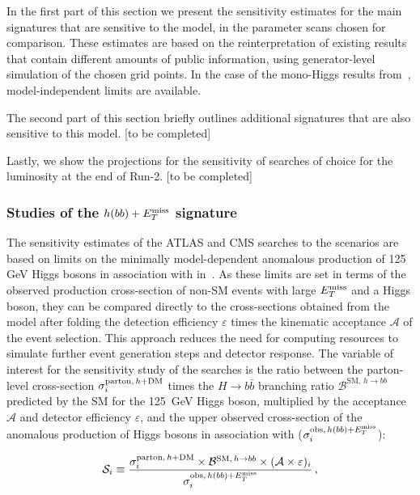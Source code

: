 In the first part of this section we present the sensitivity estimates for the main signatures that are sensitive to the model, in the parameter scans chosen for comparison. These estimates are based on the reinterpretation of existing results that contain different amounts of public information, using generator-level simulation of the chosen grid points. In the case of the mono-Higgs results from~\cite{Aaboud:2017yqz}, model-independent limits are available. 

The second part of this section briefly outlines additional signatures that are also sensitive to this model. [to be completed]

Lastly, we show the projections for the sensitivity of searches of choice for the luminosity at the end of Run-2. [to be completed]

\subsubsection{Studies of the $h(bb)+E_T^\mathrm{miss}$ signature}
\label{sec:sensi_monohbb}
%

The sensitivity estimates of the ATLAS and CMS \monohbb searches to the \hdma scenarios are based on limits on the minimally model-dependent anomalous production of 125 GeV Higgs bosons in association with \met in~\cite{Aaboud:2017yqz}. 
As these limits are set in terms of the observed production cross-section of non-SM events with large $E_T^\mathrm{miss}$ and a Higgs boson, they can be compared directly to the cross-sections obtained from the \hdma model after folding the detection efficiency $\varepsilon$ times the kinematic acceptance $\mathcal{A}$ of the event selection. This approach reduces the need for computing resources to simulate further event generation steps and detector response. 
The variable of interest for the sensitivity study of the \monohbb searches is the ratio between the parton-level cross-section $\sigma_{i}^{\mathrm{parton},\,h+\textrm{DM}}$ times the $H\rightarrow b\bar{b}$ branching ratio $\mathcal{B}^{\mathrm{SM},\,h\to bb}$ predicted by the SM for the 125~GeV Higgs boson, multiplied by the acceptance $\mathcal{A}$ and detector efficiency $\varepsilon$, and the upper observed cross-section of the anomalous production of Higgs bosons in association with \met ($\sigma_{i}^{\mathrm{obs},\,h(bb)+E_T^\mathrm{miss}}$):

\begin{equation}
\label{eq:monoHbb_sensi}
\mathcal{S}_i \equiv \frac{\sigma_{i}^{\mathrm{parton},\,h+\textrm{DM}} \times \mathcal{B}^{\mathrm{SM},\,h\to bb} \times (\mathcal{A\times\varepsilon})_{i} }
{\sigma_{i}^{\mathrm{obs},\,h(bb)+E_T^\mathrm{miss}}}\,,
\end{equation}

